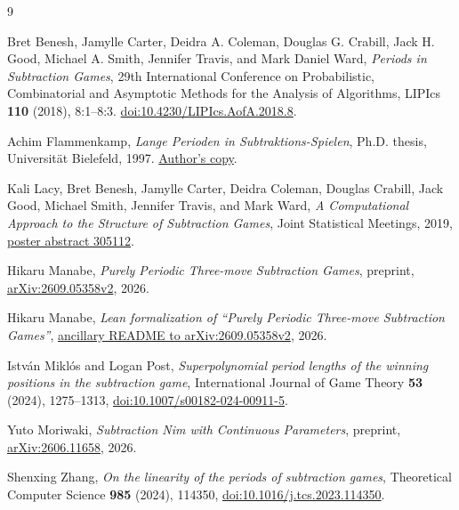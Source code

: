 \documentclass[11pt]{article}
\begin{document}
\begin{thebibliography}{9}
\raggedright
{}
Bret Benesh, Jamylle Carter, Deidra A. Coleman, Douglas G. Crabill,
Jack H. Good, Michael A. Smith, Jennifer Travis, and Mark Daniel Ward,
\emph{Periods in Subtraction Games},
29th International Conference on Probabilistic, Combinatorial and
Asymptotic Methods for the Analysis of Algorithms, LIPIcs \textbf{110}
(2018), 8:1--8:3.
\href{https://doi.org/10.4230/LIPIcs.AofA.2018.8}{doi:10.4230/LIPIcs.AofA.2018.8}.

Achim Flammenkamp,
\emph{Lange Perioden in Subtraktions-Spielen},
Ph.D. thesis, Universit\"at Bielefeld, 1997.
\href{https://wwwhomes.uni-bielefeld.de/achim/diss.ps.gz}{Author's copy}.

Kali Lacy, Bret Benesh, Jamylle Carter, Deidra Coleman, Douglas Crabill,
Jack Good, Michael Smith, Jennifer Travis, and Mark Ward,
\emph{A Computational Approach to the Structure of Subtraction Games},
Joint Statistical Meetings, 2019,
\href{https://ww2.amstat.org/meetings/jsm/2019/onlineprogram/AbstractDetails.cfm?abstractid=305112}
{poster abstract 305112}.

Hikaru Manabe,
\emph{Purely Periodic Three-move Subtraction Games},
preprint, \href{https://arxiv.org/abs/2609.05358v2}{arXiv:2609.05358v2},
2026.

Hikaru Manabe,
\emph{Lean formalization of ``Purely Periodic Three-move Subtraction Games''},
\href{https://arxiv.org/src/2609.05358v2/anc/lean-verification/README.md}
{ancillary README to arXiv:2609.05358v2}, 2026.

Istv\'an Mikl\'os and Logan Post,
\emph{Superpolynomial period lengths of the winning positions in the
subtraction game},
International Journal of Game Theory \textbf{53} (2024), 1275--1313,
\href{https://doi.org/10.1007/s00182-024-00911-5}{doi:10.1007/s00182-024-00911-5}.

Yuto Moriwaki,
\emph{Subtraction Nim with Continuous Parameters},
preprint, \href{https://arxiv.org/abs/2606.11658}{arXiv:2606.11658}, 2026.

Shenxing Zhang,
\emph{On the linearity of the periods of subtraction games},
Theoretical Computer Science \textbf{985} (2024), 114350,
\href{https://doi.org/10.1016/j.tcs.2023.114350}{doi:10.1016/j.tcs.2023.114350}.
\end{thebibliography}
\end{document}
